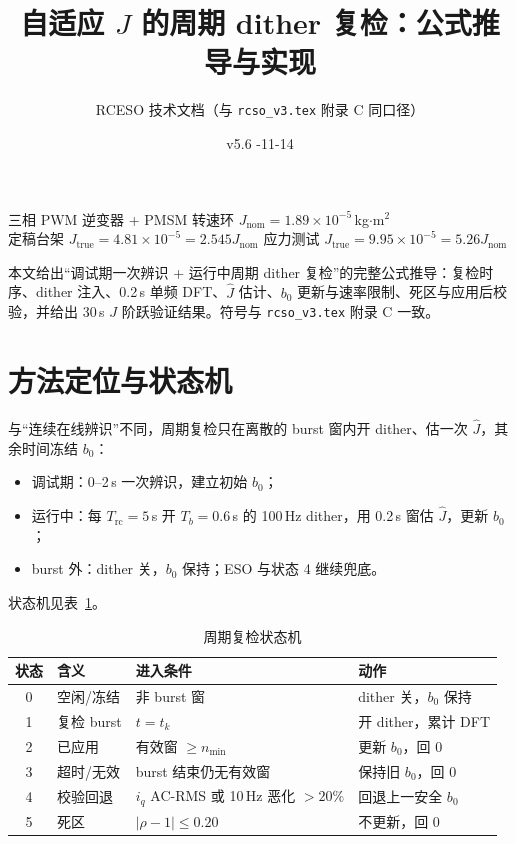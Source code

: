 \documentclass[11pt,a4paper]{article}
\title{\bfseries 自适应 $J$ 的周期 dither 复检：公式推导与实现}
\author{RCESO 技术文档（与 \texttt{rcso\_v3.tex} 附录 C 同口径）}
\date{v5.6 \quad 2026-11-14}
\newcommand{\Jnom}{J_{\mathrm{nom}}}
\newcommand{\Jtrue}{J_{\mathrm{true}}}
\newcommand{\Jhat}{\hat J}
\newcommand{\bzero}{b_0}
\begin{document}
\maketitle
\vspace{-4mm}
\begin{center}
\small 三相 PWM 逆变器 + PMSM 转速环 \quad $\Jnom=1.89\times10^{-5}$\,kg$\cdot$m$^2$\\
定稿台架 $\Jtrue=4.81\times10^{-5}=2.545\Jnom$ \quad 应力测试 $\Jtrue=9.95\times10^{-5}=5.26\Jnom$
\end{center}

本文给出“调试期一次辨识 + 运行中周期 dither 复检”的完整公式推导：复检时序、dither 注入、0.2\,s 单频 DFT、$\Jhat$ 估计、$\bzero$ 更新与速率限制、死区与应用后校验，并给出 30\,s $J$ 阶跃验证结果。符号与 \texttt{rcso\_v3.tex} 附录 C 一致。

\section{方法定位与状态机}

与“连续在线辨识”不同，周期复检只在离散的 burst 窗内开 dither、估一次 $\Jhat$，其余时间冻结 $\bzero$：
\begin{itemize}
  \item 调试期：0--2\,s 一次辨识，建立初始 $\bzero$；
  \item 运行中：每 $T_{\mathrm{rc}}=5$\,s 开 $T_b=0.6$\,s 的 100\,Hz dither，用 0.2\,s 窗估 $\Jhat$，更新 $\bzero$；
  \item burst 外：dither 关，$\bzero$ 保持；ESO 与状态 4 继续兜底。
\end{itemize}
状态机见表~\ref{tab:state}。

\begin{table}[H]
\centering\footnotesize
\caption{周期复检状态机}\label{tab:state}
\begin{tabular}{@{}clll@{}}
\toprule
状态 & 含义 & 进入条件 & 动作\\
\midrule
0 & 空闲/冻结 & 非 burst 窗 & dither 关，$\bzero$ 保持\\
1 & 复检 burst & $t=t_k$ & 开 dither，累计 DFT\\
2 & 已应用 & 有效窗 $\ge n_{\min}$ & 更新 $\bzero$，回 0\\
3 & 超时/无效 & burst 结束仍无有效窗 & 保持旧 $\bzero$，回 0\\
4 & 校验回退 & $i_q$ AC-RMS 或 10\,Hz 恶化 $>20\%$ & 回退上一安全 $\bzero$\\
5 & 死区 & $|\rho-1|\le0.20$ & 不更新，回 0\\
\bottomrule
\end{tabular}
\end{table}
\end{document}
